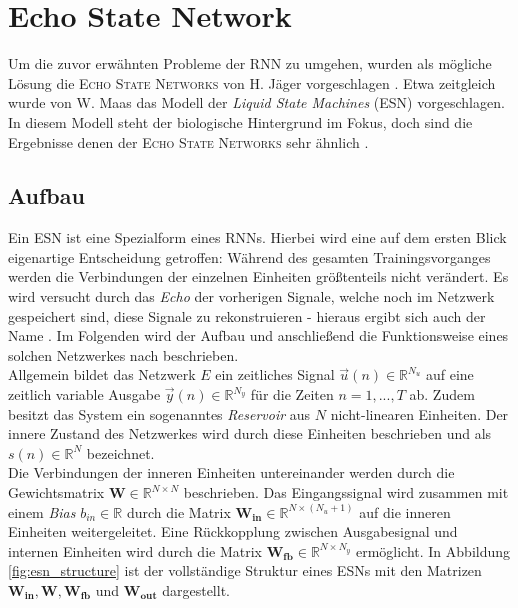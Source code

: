 \section{Echo State Network}
\label{sc:esn}
Um die zuvor erwähnten Probleme der \textsc{RNN} zu umgehen, wurden als mögliche Lösung die \textsc{Echo State Networks} von H. Jäger vorgeschlagen \cite{jaeger2010}. Etwa zeitgleich wurde von W. Maas das Modell der \textit{Liquid State Machines} (\textsc{ESN}) vorgeschlagen. In diesem Modell steht der biologische Hintergrund im Fokus, doch sind die Ergebnisse denen der \textsc{Echo State Networks} sehr ähnlich \citep{Maass2011}. 

\subsection{Aufbau}
\label{sec:esn_structure}
Ein \textsc{ESN} ist eine Spezialform eines \textsc{RNN}s. Hierbei wird eine auf dem ersten Blick eigenartige Entscheidung getroffen: Während des gesamten Trainingsvorganges werden die Verbindungen der einzelnen Einheiten größtenteils nicht verändert. Es wird versucht durch das \textit{Echo} der vorherigen Signale, welche noch im Netzwerk gespeichert sind, diese Signale zu rekonstruieren - hieraus ergibt sich auch der Name \cite{lukoseviciusa2009}. Im Folgenden wird der Aufbau und anschließend die Funktionsweise eines solchen Netzwerkes nach \citep{jaeger2007} beschrieben.\\

Allgemein bildet das Netzwerk $E$ ein zeitliches Signal $\vec{u}(n) \in \mathbb{R}^{N_u}$  auf eine zeitlich variable Ausgabe $\vec{y}(n) \in \mathbb{R}^{N_y}$ für die Zeiten $n=1, ..., T$ ab. Zudem besitzt das System ein sogenanntes \textit{Reservoir} aus $N$ nicht-linearen Einheiten. Der innere Zustand des Netzwerkes wird durch diese Einheiten beschrieben und als $s(n) \in \mathbb{R}^{N}$ bezeichnet.\\

Die Verbindungen der inneren Einheiten untereinander werden durch die Gewichtsmatrix $\mathbf{W} \in \mathbb{R}^{N \times N}$ beschrieben. Das Eingangssignal wird zusammen mit einem \textit{Bias} $b_{in} \in \mathbb{R}$ durch die Matrix $\mathbf{W_{in}} \in \mathbb{R}^{N \times (N_u+1)}$ auf die inneren Einheiten weitergeleitet. Eine Rückkopplung zwischen Ausgabesignal und internen Einheiten wird durch die Matrix $\mathbf{W_{fb}} \in \mathbb{R}^{N \times N_y}$ ermöglicht. In Abbildung \ref{fig:esn_structure} ist der vollständige Struktur eines \textsc{ESN}s mit den Matrizen $\mathbf{W_{in}}, \mathbf{W}, \mathbf{W_{fb}}$ und $\mathbf{W_{out}}$ dargestellt.

